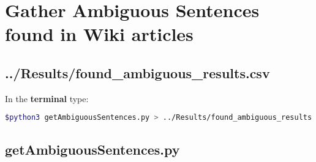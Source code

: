 
\chapter{Gather Ambiguous Sentences found in Wiki articles}

\label{Appendix4}

\section{../Results/found\_ambiguous\_results.csv}

In the \textbf{terminal} type: 
\begin{lstlisting}[language=bash]
	$python3 getAmbiguousSentences.py > ../Results/found_ambiguous_results.csv
\end{lstlisting}

\section{getAmbiguousSentences.py}

